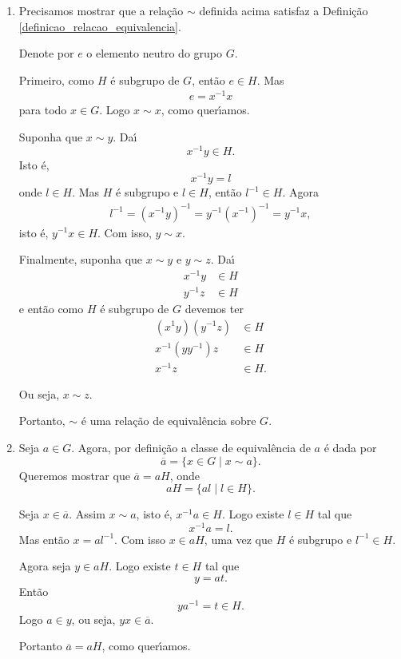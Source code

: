 \begin{prova}
	\begin{enumerate}[label={\roman*})]
		\item Precisamos mostrar que a rela\c{c}\~ao $\sim$ definida acima satisfaz a Defini\c{c}\~ao \eqref{definicao_relacao_equivalencia}.

		Denote por $e$ o elemento neutro do grupo $G$.

		Primeiro, como $H$ \'e subgrupo de $G$, ent\~ao $e \in H$. Mas
		\begin{align*}
			e = x^{-1}x
		\end{align*}
		para todo $x \in G$. Logo $x \sim x$, como quer{\'\i}amos.

		Suponha que $x \sim y$. Da{\'\i}
		\[
			x^{-1}y \in H.
		\]
		Isto \'e,
		\[
			x^{-1}y = l
		\]
		onde $l \in H$. Mas $H$ \'e subgrupo e $l \in H$, ent\~ao $l^{-1} \in H$. Agora
		\begin{align*}
			l^{-1} = (x^{-1}y)^{-1} = y^{-1}(x^{-1})^{-1} = y^{-1}x,
		\end{align*}
		isto \'e, $y^{-1}x \in H$. Com isso, $y \sim x$.

		Finalmente, suponha que $x \sim y$ e $y \sim z$. Da{\'\i}
		\begin{align*}
			x^{-1}y &\in H\\
			y^{-1}z &\in H
		\end{align*}
		e ent\~ao como $H$ \'e subgrupo de $G$ devemos ter
		\begin{align*}
			(x^{1}y)(y^{-1}z) &\in H\\
			x^{-1}(yy^{-1})z &\in H\\
			x^{-1}z &\in H.
		\end{align*}

		Ou seja, $x \sim z$.

		Portanto, $\sim$ \'e uma rela\c{c}\~ao de equival\^encia sobre $G$.

		\item Seja $a \in G$. Agora, por defini\c{c}\~ao a classe de equival\^encia de $a$ \'e dada por
		\[
			\overline{a} = \{ x \in G \mid x \sim a\}.
		\]
		Queremos mostrar que $\overline{a} = aH$, onde
		\[
			aH = \{al \mid l \in H\}.
		\]

		Seja $x \in \overline{a}$. Assim $x \sim a$, isto \'e, $x^{-1}a \in H$. Logo existe $l \in H$ tal que
		\[
			x^{-1}a = l.
		\]
		Mas ent\~ao $x = al^{-1}$. Com isso $x \in aH$, uma vez que $H$ \'e subgrupo e $l^{-1} \in H$.

		Agora seja $y \in aH$. Logo existe $t \in H$ tal que
		\[
			y = at.
		\]
		Ent\~ao
		\[
			ya^{-1} = t \in H.
		\]
		Logo $a \in y$, ou seja, $yx \in \overline{a}$.

		Portanto $\overline{a} = aH$, como quer{\'\i}amos.
	\end{enumerate}
\end{prova}

